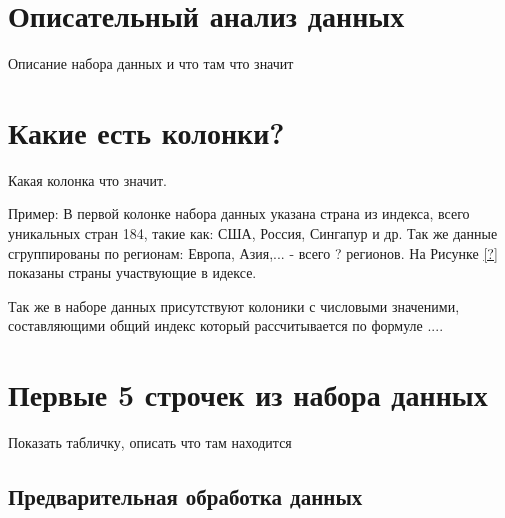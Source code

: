 \section{Описательный анализ данных}
Описание набора данных и что там что значит

\section{Какие есть колонки?}
Какая колонка что значит.

Пример: В первой колонке набора данных указана страна из индекса, всего уникальных стран 184, такие как: США, Россия, Сингапур и др. Так же данные сгруппированы по регионам: Европа, Азия,... - всего ? регионов. На Рисунке \ref{?} показаны страны участвующие в идексе.

Так же в наборе данных присутствуют колоники с числовыми значеними, составляющими общий индекс который рассчитывается по формуле ....



\section{Первые 5 строчек из набора данных}
Показать табличку, описать что там находится


\subsection{Предварительная обработка данных}